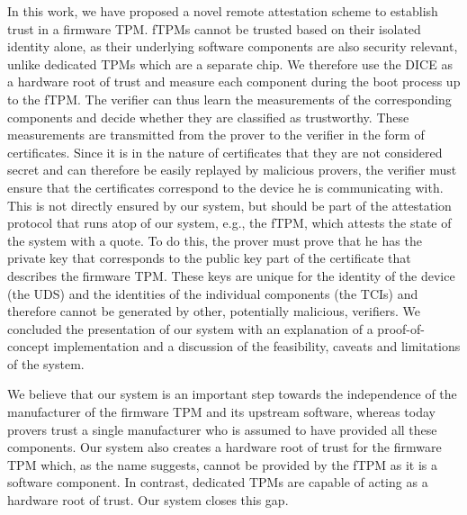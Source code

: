 In this work, we have proposed a novel remote attestation scheme to establish trust in a firmware TPM\@.
fTPMs cannot be trusted based on their isolated identity alone, as their underlying software components are also security relevant, unlike dedicated TPMs which are a separate chip.
We therefore use the DICE as a hardware root of trust and measure each component during the boot process up to the fTPM\@.
The verifier can thus learn the measurements of the corresponding components and decide whether they are classified as trustworthy.
These measurements are transmitted from the prover to the verifier in the form of certificates.
Since it is in the nature of certificates that they are not considered secret and can therefore be easily replayed by malicious provers, the verifier must ensure that the certificates correspond to the device he is communicating with.
This is not directly ensured by our system, but should be part of the attestation protocol that runs atop of our system, e.g., the fTPM, which attests the state of the system with a quote.
To do this, the prover must prove that he has the private key that corresponds to the public key part of the certificate that describes the firmware TPM\@.
These keys are unique for the identity of the device (the UDS) and the identities of the individual components (the TCIs) and therefore cannot be generated by other, potentially malicious, verifiers.
We concluded the presentation of our system with an explanation of a proof-of-concept implementation and a discussion of the feasibility, caveats and limitations of the system.

We believe that our system is an important step towards the independence of the manufacturer of the firmware TPM and its upstream software, whereas today provers trust a single manufacturer who is assumed to have provided all these components.
Our system also creates a hardware root of trust for the firmware TPM which, as the name suggests, cannot be provided by the fTPM as it is a software component.
In contrast, dedicated TPMs are capable of acting as a hardware root of trust.
Our system closes this gap.
